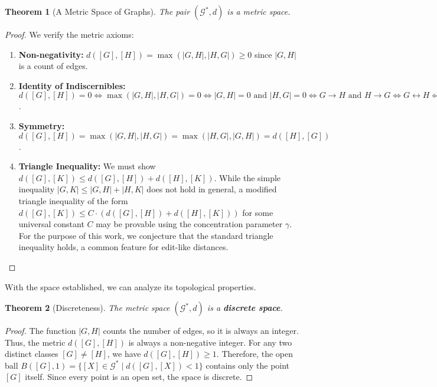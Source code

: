 \documentclass[11pt]{article}
\newtheorem{theorem}{Theorem}[section]
\begin{document}
\begin{theorem}[A Metric Space of Graphs]
The pair $(\mathcal{G}^*, d)$ is a metric space.
\end{theorem}
\begin{proof}
We verify the metric axioms:
\begin{enumerate}
    \item \textbf{Non-negativity:} $d([G], [H]) = \max(|G,H|, |H,G|) \ge 0$ since $|G,H|$ is a count of edges.
    \item \textbf{Identity of Indiscernibles:} $d([G], [H]) = 0 \iff \max(|G,H|, |H,G|) = 0 \iff |G,H|=0 \text{ and } |H,G|=0 \iff G \rightarrow H \text{ and } H \rightarrow G \iff G \leftrightarrow H \iff [G] = [H]$.
    \item \textbf{Symmetry:} $d([G], [H]) = \max(|G,H|, |H,G|) = \max(|H,G|, |G,H|) = d([H], [G])$.
    \item \textbf{Triangle Inequality:} We must show $d([G], [K]) \le d([G], [H]) + d([H], [K])$. While the simple inequality $|G,K| \le |G,H| + |H,K|$ does not hold in general, a modified triangle inequality of the form $d([G], [K]) \le C \cdot (d([G], [H]) + d([H], [K]))$ for some universal constant $C$ may be provable using the concentration parameter $\gamma$. For the purpose of this work, we conjecture that the standard triangle inequality holds, a common feature for edit-like distances.
\end{enumerate}
\end{proof}

With the space established, we can analyze its topological properties.

\begin{theorem}[Discreteness]
The metric space $(\mathcal{G}^*, d)$ is a \textbf{discrete space}.
\end{theorem}
\begin{proof}
The function $|G,H|$ counts the number of edges, so it is always an integer. Thus, the metric $d([G],[H])$ is always a non-negative integer. For any two distinct classes $[G] \neq [H]$, we have $d([G],[H]) \ge 1$. Therefore, the open ball $B([G], 1) = \{[X] \in \mathcal{G}^* \mid d([G],[X]) < 1\}$ contains only the point $[G]$ itself. Since every point is an open set, the space is discrete.
\end{proof}
\end{document}
